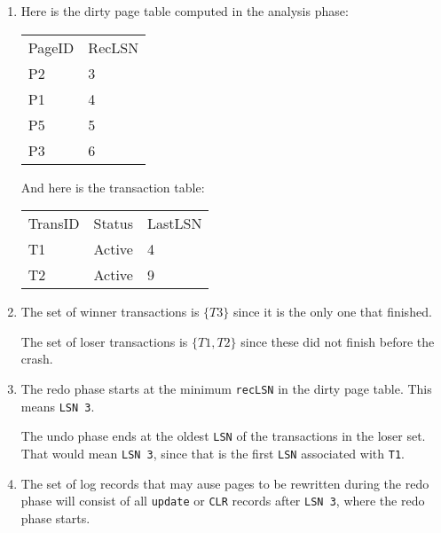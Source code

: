 \documentclass[11pt]{article}
\begin{document}
\begin{enumerate}
  \item
    Here is the dirty page table computed in the analysis phase:

    \begin{center}
      \begin{tabular}{ll}
      \rowcolor[HTML]{C0C0C0} 
      PageID & RecLSN \\
      P2     & 3      \\
      P1     & 4      \\
      P5     & 5      \\
      P3     & 6     
      \end{tabular}
    \end{center}

    And here is the transaction table:

    \begin{center}
      \centering
      \begin{tabular}{lll}
      \rowcolor[HTML]{C0C0C0} 
      TransID                    & Status & LastLSN \\
      \cellcolor[HTML]{6434FC}T1 & Active & 4       \\
      \cellcolor[HTML]{67FD9A}T2 & Active & 9      
      \end{tabular}
    \end{center}
  \item
    The set of winner transactions is $\{T3\}$ since it is the only one that finished.

    The set of loser transactions is $\{T1,T2\}$ since these did not finish before the crash.
  \item
    The redo phase starts at the minimum \verb|recLSN| in the dirty page table. This means 
    \verb|LSN 3|.

    The undo phase ends at the oldest \verb|LSN| of the transactions in the
    loser set. That would mean \verb|LSN 3|, since that is the first \verb|LSN|
    associated with \verb|T1|.
  \item
    The set of log records that may ause pages to be rewritten during the redo phase will
    consist of all \verb|update| or \verb|CLR| records after \verb|LSN 3|, where the redo phase starts.


\end{enumerate}
\end{document}
